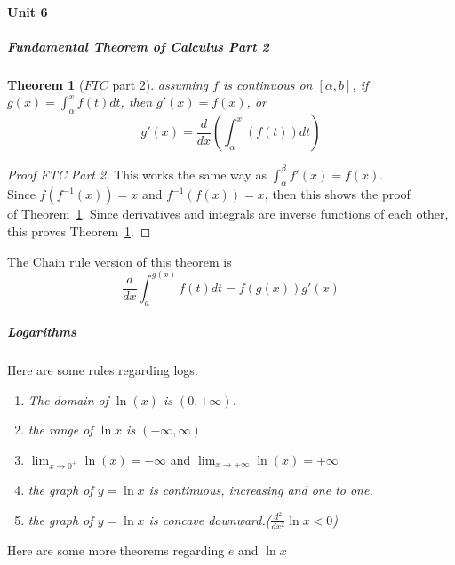 \documentclass{article} %
\theoremstyle{theorem}
\newtheorem{theorem}{Theorem}[paragraph]
\theoremstyle{definition}
\begin{document}
            \paragraph{Unit 6}
                \subparagraph{Fundamental Theorem of Calculus Part 2}
                    \begin{theorem}[$FTC$ part 2]
                        \label{thm:FTCpt2}
                        assuming $f$ is continuous on $[\alpha,b]$, if $g(x)=\int_{\alpha}^{x}f(t)dt$, then $g'(x)=f(x)$, or \begin{equation} g'(x) = \frac{d}{dx}(\int_{\alpha}^{x}(f(t))dt) \end{equation}
                    \end{theorem}
                    \begin{proof}[Proof FTC Part 2]
                        This works the same way as $\int_{\alpha}^{\beta}f'(x)=f(x)$. \\Since $f(f^{-1}(x))=x$ and $f^{-1}(f(x))=x$, then this shows the proof \\of Theorem~\ref{thm:FTCpt2}.
                        Since derivatives and integrals are inverse functions of each other, this proves Theorem~\ref{thm:FTCpt2}.
                    \end{proof}
                    The Chain rule version of this theorem is \begin{equation}
                        \frac{d}{dx}\int_{a}^{g(x)}f(t)dt = f(g(x))g'(x)
                    \end{equation}
                \subparagraph{Logarithms}
                    Here are some rules regarding logs.
                    \begin{enumerate}
                        \item \textit{The domain of \emph{$\ln(x)$} is \emph{$(0,+\infty)$}.}
                        \item \textit{the range of \emph{$\ln x$} is $(-\infty,\infty)$}
                        \item $\lim_{x\rightarrow0^+}\ln(x)=-\infty$ and $\lim_{x\rightarrow+\infty}\ln(x)=+\infty$
                        \item \textit{the graph of \emph{$y=\ln x$} is continuous, increasing and one to one.}
                        \item \textit{the graph of \emph{$y=\ln x$} is concave downward.(\emph{$\frac{d^2}{dx^2}\ln x < 0$})}
                    \end{enumerate}
                    Here are some more theorems regarding $e$ and $\ln x$
\end{document}
